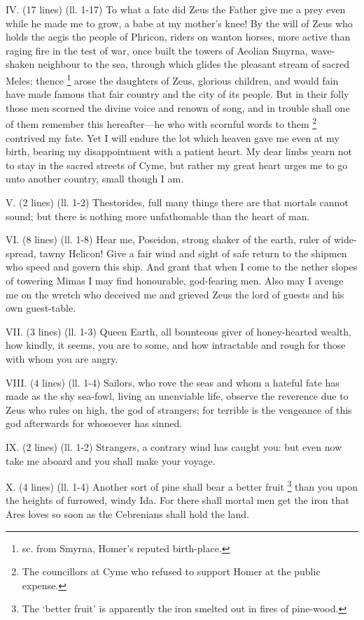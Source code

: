 IV. (17 lines) (ll. 1-17) To what a fate did Zeus the Father give me a prey
even while he made me to grow, a babe at my mother’s knee! By the will of
Zeus who holds the aegis the people of Phricon, riders on wanton horses, more
active than raging fire in the test of war, once built the towers of Aeolian
Smyrna, wave-shaken neighbour to the sea, through which glides the pleasant
stream of sacred Meles; thence \footnote{sc. from Smyrna,
Homer’s reputed birth-place.} arose the daughters of Zeus,
glorious children, and would fain have made famous that fair country and the
city of its people. But in their folly those men scorned the divine voice and
renown of song, and in trouble shall one of them remember this
hereafter—he who with scornful words to them \footnote{The councillors at Cyme
who refused to support Homer at the public expense.} contrived
my fate. Yet I will endure the lot which heaven gave me even at my birth,
bearing my disappointment with a patient heart. My dear limbs yearn not to stay
in the sacred streets of Cyme, but rather my great heart urges me to go unto
another country, small though I am.

V. (2 lines) (ll. 1-2) Thestorides, full many things there are that mortals
cannot sound; but there is nothing more unfathomable than the heart of man.

VI. (8 lines) (ll. 1-8) Hear me, Poseidon, strong shaker of the earth, ruler of
wide-spread, tawny Helicon! Give a fair wind and sight of safe return to the
shipmen who speed and govern this ship. And grant that when I come to the
nether slopes of towering Mimas I may find honourable, god-fearing men. Also
may I avenge me on the wretch who deceived me and grieved Zeus the lord of
guests and his own guest-table.

VII. (3 lines) (ll. 1-3) Queen Earth, all bounteous giver of honey-hearted
wealth, how kindly, it seems, you are to some, and how intractable and rough
for those with whom you are angry.

VIII. (4 lines) (ll. 1-4) Sailors, who rove the seas and whom a hateful fate
has made as the shy sea-fowl, living an unenviable life, observe the reverence
due to Zeus who rules on high, the god of strangers; for terrible is the
vengeance of this god afterwards for whosoever has sinned.

IX. (2 lines) (ll. 1-2) Strangers, a contrary wind has caught you: but even now
take me aboard and you shall make your voyage.

X. (4 lines) (ll. 1-4) Another sort of pine shall bear a better fruit \footnote{The ‘better
fruit’ is apparently the iron smelted out in fires of pine-wood.} than you upon the heights of
furrowed, windy Ida. For there shall mortal men get the iron that Ares loves so
soon as the Cebrenians shall hold the land.

